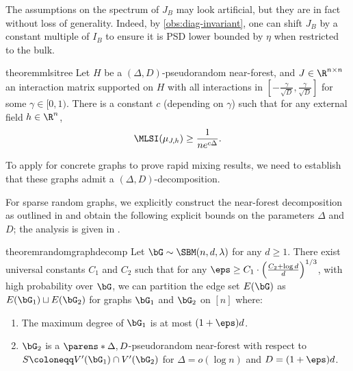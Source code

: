 \documentclass[11pt,letterpaper]{article}
\begin{document}
    \begin{remark}
        The assumptions on the spectrum of $J_B$ may look artificial, but they are in fact without loss of generality. Indeed, by \cref{obs:diag-invariant}, one can shift $J_B$ by a constant multiple of $I_B$ to ensure it is PSD lower bounded by $\eta$ when restricted to the bulk. 
    \end{remark}
    \begin{restatable}{theorem}{mlsitree}
        \label{thm:mlsi-bdd-growth-tree}
        Let $H$ be a $(\Delta,D)$-pseudorandom near-forest, and $J \in \R^{n \times n}$ an interaction matrix supported on $H$ with all interactions in $\left[ - \frac{\gamma}{\sqrt{D}} , \frac{\gamma}{\sqrt{D}} \right]$ for some $\gamma \in [0,1)$. There is a constant $c$ (depending on $\gamma$) such that for any external field $h \in \R^{n}$,
        \[ \MLSI(\mu_{J,h}) \ge \frac{1}{ne^{c\Delta}} . \]
    \end{restatable}

    To apply  for concrete graphs to prove rapid mixing results, we need to establish that these graphs admit a $(\Delta, D)$-decomposition. 


    For sparse random graphs, we explicitly construct the near-forest decomposition as outlined in  and obtain the following explicit bounds on the parameters $\Delta$ and $D$; the analysis is given in .
    \begin{restatable}{theorem}{randomgraphdecomp}   \label{lem:random-graph-decomposition}
        Let $\bG\sim\SBM(n, d, \lambda)$ for any $d\ge 1$.
        There exist universal constants $C_1$ and $C_2$ such that for any $\eps \ge C_1 \cdot \left( \frac{C_2 + \log d}{d} \right)^{1/3}$, with high probability over $\bG$, we can partition the edge set $E(\bG)$ as $E(\bG_1) \sqcup E(\bG_2)$ for graphs $\bG_1$ and $\bG_2$ on $[n]$ where:
        \begin{enumerate}
            \item \label{item:max-degree-bound} The maximum degree of $\bG_1$ is at most $(1+\eps)d$.
            \item \label{item:near-forest-property} $\bG_2$ is a $\parens*{\Delta, D}$-pseudorandom near-forest with respect to $S\coloneqq V'(\bG_1)\cap V'(\bG_2)$ for $\Delta = o(\log n)$ and $D = (1+\eps)d$.
        \end{enumerate}
    \end{restatable}
    
\end{document}
